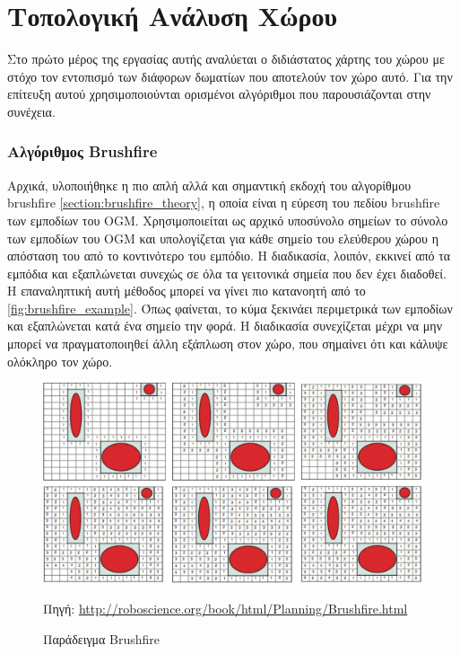 \section{Τοπολογική Ανάλυση Χώρου}
\label{section:map_annotation}

Στο πρώτο μέρος της εργασίας αυτής αναλύεται ο διδιάστατος χάρτης του χώρου με στόχο τον εντοπισμό των διάφορων δωματίων που αποτελούν τον χώρο αυτό. Για την επίτευξη αυτού χρησιμοποιούνται ορισμένοι αλγόριθμοι που παρουσιάζονται στην συνέχεια. 

\subsubsection{Αλγόριθμος Brushfire}
\label{subsection:brushfire_algorithms}

Αρχικά, υλοποιήθηκε η πιο απλή αλλά και σημαντική εκδοχή του αλγορίθμου brushfire \ref{section:brushfire_theory}, η οποία είναι η εύρεση του πεδίου brushfire των εμποδίων του OGM. Χρησιμοποιείται ως αρχικό υποσύνολο σημείων το σύνολο των εμποδίων του OGM και υπολογίζεται για κάθε σημείο του ελεύθερου χώρου η απόσταση του από το κοντινότερο του εμπόδιο. Η διαδικασία, λοιπόν, εκκινεί από τα εμπόδια και εξαπλώνεται συνεχώς σε όλα τα γειτονικά σημεία που δεν έχει διαδοθεί. Η επαναληπτική αυτή μέθοδος μπορεί να γίνει πιο κατανοητή από το \autoref{fig:brushfire_example}. Όπως φαίνεται, το κύμα ξεκινάει περιμετρικά των εμποδίων και εξαπλώνεται κατά ένα σημείο την φορά. Η διαδικασία συνεχίζεται μέχρι να μην μπορεί να πραγματοποιηθεί άλλη εξάπλωση στον χώρο, που σημαίνει ότι και κάλυψε ολόκληρο τον χώρο.


\begin{figure}[!htb]
    \centering
    \includegraphics[width=\textwidth]{./images/chapter5/brushfire0.png}
    \caption{Παράδειγμα Brushfire}
    Πηγή: \href{http://roboscience.org/book/html/Planning/Brushfire.html}{http://roboscience.org/book/html/Planning/Brushfire.html}
    \label{fig:brushfire_example}
\end{figure}



